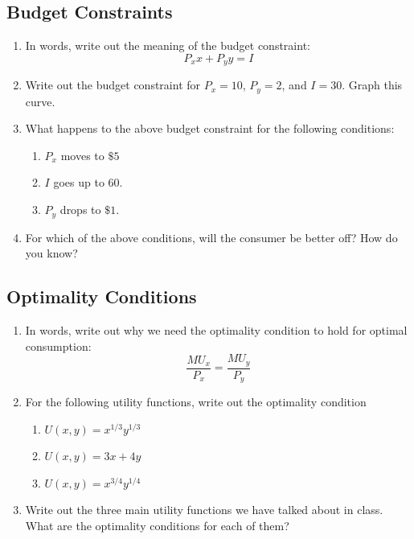 \documentclass[11pt]{article}
\begin{document}
\subsection*{Budget Constraints}
\begin{enumerate}
  \item In words, write out the meaning of the budget constraint: 
  $$P_x x + P_y y = I$$

  \item Write out the budget constraint for $P_x = 10$, $P_y = 2$, and $I = 30$. Graph this curve.
  
  \item What happens to the above budget constraint for the following conditions:
  \begin{enumerate}
    \item $P_x$ moves to $\$5$
    \item $I$ goes up to $60$.
    \item $P_y$ drops to $\$1$.
  \end{enumerate}

  \item For which of the above conditions, will the consumer be better off? How do you know? 
\end{enumerate}


\subsection*{Optimality Conditions}
\begin{enumerate}
  \item In words, write out why we need the optimality condition to hold for optimal consumption:
  $$
    \frac{MU_x}{P_x} = \frac{MU_y}{P_y}
  $$

  \item For the following utility functions, write out the optimality condition
  \begin{enumerate}
    \item $U(x,y) = x^{1/3}y^{1/3}$
    \item $U(x,y) = 3x + 4y$
    \item $U(x,y) = x^{3/4}y^{1/4}$
  \end{enumerate}

  \item Write out the three main utility functions we have talked about in class. What are the optimality conditions for each of them?
\end{enumerate}
\end{document}
